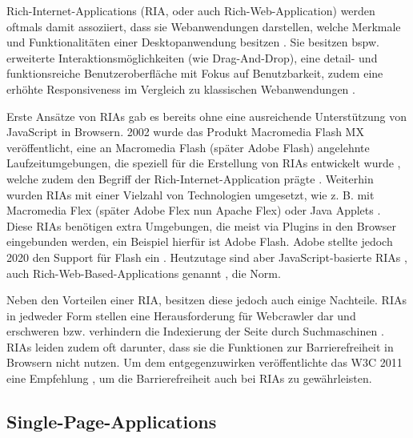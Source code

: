 
Rich-Internet-Applications (RIA, oder auch Rich-Web-Application) werden oftmals damit assoziiert, dass sie Webanwendungen darstellen, welche Merkmale und Funktionalitäten einer Desktopanwendung besitzen \cite{TenYearsOfRIAs} \cite{NecessityOfMethodologiesToModelRIAs}. Sie besitzen bspw. erweiterte Interaktionsmöglichkeiten (wie Drag-And-Drop), eine detail- und funktionsreiche Benutzeroberfläche mit Fokus auf Benutzbarkeit, zudem eine erhöhte Responsiveness im Vergleich zu klassischen Webanwendungen \cite{TenYearsOfRIAs}.

Erste Ansätze von RIAs gab es bereits ohne eine ausreichende Unterstützung von JavaScript in Browsern. 2002 wurde das Produkt Macromedia Flash MX veröffentlicht, eine an Macromedia Flash (später Adobe Flash) angelehnte Laufzeitumgebungen, die speziell für die Erstellung von RIAs entwickelt wurde \cite{MacromediaFlashMXWhitePaper}, welche zudem den Begriff der Rich-Internet-Application prägte \cite{TenYearsOfRIAs}. Weiterhin wurden RIAs mit einer Vielzahl von Technologien umgesetzt, wie z. B. mit Macromedia Flex (später Adobe Flex nun Apache Flex) oder Java Applets \cite{NecessityOfMethodologiesToModelRIAs} \cite{RIAsTheNextStageOfApplicationDevelopment} \cite{RichInternetApplications} \cite{FinkIntroducingSPAs}. Diese RIAs benötigen extra Umgebungen, die meist via Plugins in den Browser eingebunden werden, ein Beispiel hierfür ist Adobe Flash. Adobe stellte jedoch 2020 den Support für Flash ein \cite{Netlytic}. Heutzutage sind aber JavaScript-basierte RIAs \cite{RIAsTheNextStageOfApplicationDevelopment}, auch Rich-Web-Based-Applications genannt \cite{RichWebBasedApplications} \cite{Netlytic}, die Norm. 

Neben den Vorteilen einer RIA, besitzen diese jedoch auch einige Nachteile. RIAs in jedweder Form stellen eine Herausforderung für Webcrawler dar und erschweren bzw. verhindern die Indexierung der Seite durch Suchmaschinen \cite{CrawlingRIAs}. RIAs leiden zudem oft darunter, dass sie die Funktionen zur Barrierefreiheit in Browsern nicht nutzen. Um dem entgegenzuwirken veröffentlichte das W3C 2011 eine Empfehlung \cite{W3CAccessibleRIAs}, um die Barrierefreiheit auch bei RIAs zu gewährleisten.

\subsection{Single-Page-Applications}
\label{sec:single-page-applications}

